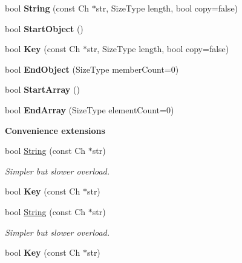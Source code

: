 \begin{Indent}
\begin{DoxyCompactItemize}
bool {\bfseries String} (const Ch $\ast$str, Size\+Type length, bool copy=false)
\item 
\mbox{\label{classWriter_a393fe59329dfd8110016183090b02d57}} 
bool {\bfseries Start\+Object} ()
\item 
\mbox{\label{classWriter_a88f8aa2df45426ba81d293ddc71698af}} 
bool {\bfseries Key} (const Ch $\ast$str, Size\+Type length, bool copy=false)
\item 
\mbox{\label{classWriter_a3705f6d3f9a820f0a6652089222ed3ac}} 
bool {\bfseries End\+Object} (Size\+Type member\+Count=0)
\item 
\mbox{\label{classWriter_a8a981ed4f5618a545724789ee4c8dedb}} 
bool {\bfseries Start\+Array} ()
\item 
\mbox{\label{classWriter_ad8680f9f8d3289dad72f1f18a8763aa1}} 
bool {\bfseries End\+Array} (Size\+Type element\+Count=0)
\end{DoxyCompactItemize}
\end{Indent}
\begin{Indent}\textbf{ Convenience extensions}\par
\begin{DoxyCompactItemize}
\item 
\mbox{\label{classWriter_ad1525690e1d598d7e32892b8b83fbcd4}} 
bool \hyperlink{classWriter_ad1525690e1d598d7e32892b8b83fbcd4}{String} (const Ch $\ast$str)
\begin{DoxyCompactList}\small\item\em Simpler but slower overload. \end{DoxyCompactList}\item 
\mbox{\label{classWriter_a77dbb4676e57aab1c0e976ec22145fb9}} 
bool {\bfseries Key} (const Ch $\ast$str)
\item 
\mbox{\label{classWriter_ad1525690e1d598d7e32892b8b83fbcd4}} 
bool \hyperlink{classWriter_ad1525690e1d598d7e32892b8b83fbcd4}{String} (const Ch $\ast$str)
\begin{DoxyCompactList}\small\item\em Simpler but slower overload. \end{DoxyCompactList}\item 
\mbox{\label{classWriter_a77dbb4676e57aab1c0e976ec22145fb9}} 
bool {\bfseries Key} (const Ch $\ast$str)
\end{DoxyCompactItemize}
\end{Indent}

